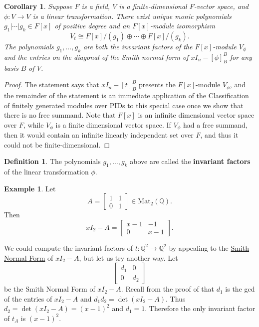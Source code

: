 \documentclass[12pt]{report}
\newtheorem{corollary}[theorem]{Corollary}
\numberwithin{equation}{section}
\numberwithin{theorem}{chapter}
\theoremstyle{definition}
\newtheorem{definition}[theorem]{Definition}
\newtheorem{example}[theorem]{Example}
\newtheorem*{basic properties}{Basic Properties}
\newtheorem*{Important Remark}{Important Remark}
\newcommand{\df}[1]{{\bf #1}\index{#1}}
\begin{document}
\begin{corollary}\label{cor:IFendo}
Suppose $F$ is a field, $V$ is a finite-dimensional $F$-vector space, and $\phi\!:V\to V$ is a linear transformation. There exist unique monic polynomials $g_1 | \cdots | g_k \in F[x]$ of positive degree and an $F[x]$-module isomorphism 
$$V_{t} \cong F[x]/(g_1)\oplus \cdots \oplus F[x]/(g_k).$$ 
The polynomials $g_1,\ldots, g_k$ are both the invariant factors of the $F[x]$-module $V_{\phi}$ and the entries on the diagonal of the Smith normal form of $xI_n-[\phi]_B^B$ for any basis $B$ of $V$.
\end{corollary}

\begin{proof}
The statement says that $xI_n-[t]_B^B$ presents the $F[x]$-module $V_\phi$, and the remainder of the statement is an immediate application of the Classification of finitely generated modules over PIDs to this special case once we show that there is no free summand. Note that $F[x]$ is an infinite dimensional vector space over $F$, while $V_\phi$ is a finite dimensional vector space. If $V_\phi$ had a free summand, then it would contain an infinite linearly independent set over $F$, and thus it could not be finite-dimensional.
\end{proof}


\begin{definition}
The polynomials $g_1,\ldots,g_k$ above are called the \df{invariant factors} of the linear transformation $\phi$.
\end{definition}


\begin{example}\label{ex:SNF}
Let 
$$A= \begin{bmatrix} 1 & 1 \\ 0 & 1  \end{bmatrix}\in \mathrm{Mat}_2(\mathbb{Q}).$$ 
Then 
$$xI_2-A= \begin{bmatrix} x-1 & -1 \\ 0 & x-1  \end{bmatrix}.$$

We could compute the invariant factors of $t\!:\mathbb{Q}^2\to\mathbb{Q}^2$ by appealing to the \hyperref[Smith Normal Form]{Smith Normal Form} of $xI_2-A$, but let us try another way. Let
$$\begin{bmatrix} d_1 & 0 \\ 0 & d_2 \end{bmatrix}$$
be the Smith Normal Form of $xI_2-A$. Recall from the proof of  that $d_1$ is the gcd of the entries of $xI_2-A$ and $d_1d_2=\det(xI_2-A)$. Thus $d_2=\det(xI_2-A)=(x-1)^2$ and $d_1=1$. Therefore the only invariant factor of $t_A$ is $(x-1)^2$.
\end{example}
\end{document}
